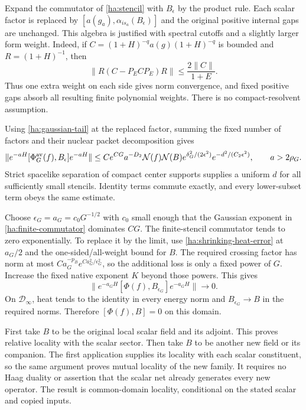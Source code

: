 Expand the commutator of \eqref{ha:stencil} with $B_\epsilon$ by the
product rule.  Each scalar factor is replaced by
$[a(g_a),\alpha_{is_a}(B_\epsilon)]$ and the original positive internal
gaps are unchanged.  This algebra is justified with spectral cutoffs
and a slightly larger form weight.  Indeed, if
$C=(1+H)^{-q}a(g)(1+H)^{-q}$ is bounded and $R=(1+H)^{-1}$, then
\begin{equation}
 \|R(C-P_ECP_E)R\|\leq\frac{2\|C\|}{1+E}.
 \label{ha:cutoff-form}
\end{equation}
Thus one extra weight on each side gives norm convergence, and fixed
positive gaps absorb all resulting finite polynomial weights.  There
is no compact-resolvent assumption.

Using \eqref{ha:gaussian-tail} at the replaced factor, summing the fixed
number of factors and their nuclear packet decomposition gives
\begin{equation}
 \|e^{-aH}[\Phi_G^{\rm av}(f),B_\epsilon]e^{-aH}\|
 \leq Ce^{CG}a^{-D_2}\mathcal N(f)\mathcal N(B)
       e^{\delta_G^2/(2\epsilon^2)}e^{-d^2/(C_2\epsilon^2)},
 \qquad a>2\rho_G.
 \label{ha:finite-commutator}
\end{equation}
Strict spacelike separation of compact center supports supplies a
uniform $d$ for all sufficiently small stencils.  Identity terms commute
exactly, and every lower-subset term obeys the same estimate.

Choose $\epsilon_G=a_G=c_0G^{-1/2}$ with $c_0$ small enough that the
Gaussian exponent in \eqref{ha:finite-commutator} dominates $CG$.
The finite-stencil commutator tends to zero exponentially.  To replace
it by the limit, use \eqref{ha:shrinking-heat-error} at $a_G/2$ and the
one-sided/all-weight bound for $B$.  The required crossing factor has
norm at most $Ca_G^{-p_B}e^{Ca_G^2/\epsilon_G^2}$, so the additional
loss is only a fixed power of $G$.  Increase the fixed native exponent
$K$ beyond those powers.  This gives
\begin{equation}
 \|e^{-a_GH}[\Phi(f),B_{\epsilon_G}]e^{-a_GH}\|\longrightarrow0.
 \label{ha:limiting-commutator}
\end{equation}
On $\mathcal D_\infty$, heat tends to the identity in every energy norm
and $B_{\epsilon_G}\to B$ in the required norms.  Therefore
$[\Phi(f),B]=0$ on this domain.

First take $B$ to be the original local scalar field and its adjoint.
This proves relative locality with the scalar sector.  Then take $B$
to be another new field or its companion.  The first application
supplies its locality with each scalar constituent, so the same
argument proves mutual locality of the new family.  It requires no
Haag duality or assertion that the scalar net already generates every
new operator.  The result is common-domain locality, conditional on
the stated scalar and copied inputs.

